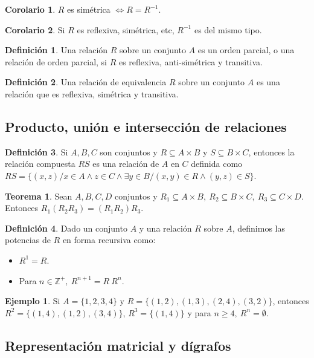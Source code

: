 \documentclass[10pt]{article}
\theoremstyle{definition}
\newtheorem{definition}{Definición}[section]
\newtheorem{theorem}{Teorema}[section]
\newtheorem{corollary}{Corolario}[theorem]
\newtheorem{example}{Ejemplo}[section]
\begin{document}
    \begin{corollary}
        $R$ es simétrica $\Leftrightarrow R=R^{-1}$.
    \end{corollary}
    \begin{corollary}
        Si $R$ es reflexiva, simétrica, etc, $R^{-1}$ es del mismo tipo.
    \end{corollary}
    \begin{definition}
        Una relación $R$ sobre un conjunto $A$ es un orden parcial, o una relación de orden parcial, si $R$ es reflexiva, anti-simétrica y transitiva.
    \end{definition}
    \begin{definition}
        Una relación de equivalencia $R$ sobre un conjunto $A$ es una relación que es reflexiva, simétrica y transitiva.
    \end{definition}
    \subsection{Producto, unión e intersección de relaciones}
    \begin{definition}
        Si $A,B,C$ son conjuntos y $R\subseteq A\times B$ y $S\subseteq B\times C$, entonces la relación compuesta $RS$ es una relación de $A$ en $C$ definida como $RS=\{(x,z) / x\in A \wedge z\in C \wedge \exists y\in B / (x,y)\in R \wedge (y,z)\in S \}$.
    \end{definition}
    \begin{theorem}
        Sean $A,B,C,D$ conjuntos y $R_1\subseteq A\times B,\ R_2\subseteq B\times C,\ R_3\subseteq C\times D$.\\Entonces $R_1(R_2R_3)=(R_1R_2)R_3$.
    \end{theorem}
    \begin{definition}
        Dado un conjunto $A$ y una relación $R$ sobre $A$, definimos las potencias de $R$ en forma recursiva como:
        \begin{itemize}
            \item $R^1=R$.
            \item Para $n\in\mathbb{Z}^+,\ R^{n+1}=R\ R^n$.
        \end{itemize}
    \end{definition}
    \begin{example}
        Si $A=\{1,2,3,4\}$ y $R=\{(1,2),(1,3),(2,4),(3,2)\}$, entonces $R^2=\{(1,4),(1,2),(3,4)\}$, $R^3=\{(1,4)\}$ y para $n\ge4,\ R^n=\emptyset$.
    \end{example}
    \newpage\subsection{Representación matricial y dígrafos}
\end{document}
